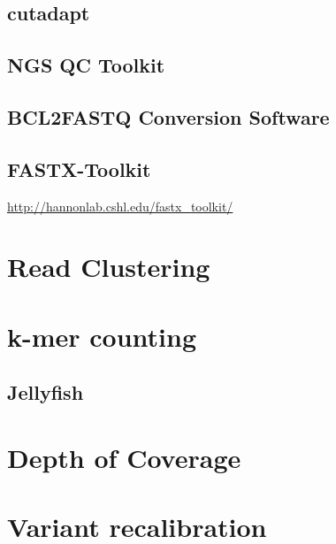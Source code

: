 \subsection{cutadapt}

\subsection{NGS QC Toolkit}

\subsection{BCL2FASTQ Conversion Software}

\subsection{FASTX-Toolkit}

\url{http://hannonlab.cshl.edu/fastx_toolkit/}


\section{Read Clustering}


\section{k-mer counting}

\subsection{Jellyfish}


\section{Depth of Coverage}


\section{Variant recalibration}

